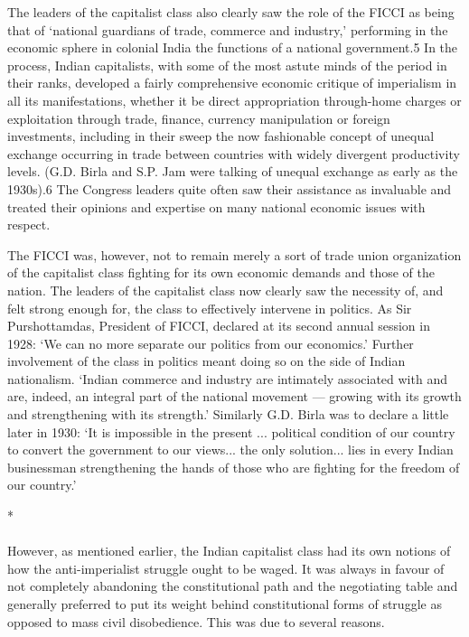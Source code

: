 The leaders of the capitalist class also clearly saw the role of the FICCI as being that of `national guardians of trade, commerce and industry,' performing in the economic sphere in colonial India the functions of a national government.5 In the process, Indian capitalists, with some of the most astute minds of the period in their ranks, developed a fairly comprehensive economic critique of imperialism in all its manifestations, whether it be direct appropriation through-home charges or exploitation through trade, finance, currency manipulation or foreign investments, including in their sweep the now fashionable concept of unequal exchange occurring in trade between countries with widely divergent productivity levels. (G.D. Birla and S.P. Jam were talking of unequal exchange as early as the 1930s).6 The Congress leaders quite often saw their assistance as invaluable and treated their opinions and expertise on many national economic issues with respect. 

The FICCI was, however, not to remain merely a sort of trade union organization of the capitalist class fighting for its own economic demands and those of the nation. The leaders of the capitalist class now clearly saw the necessity of, and felt strong enough for, the class to effectively intervene in politics. As Sir Purshottamdas, President of FICCI, declared at its second annual session in 1928: `We can no more separate our politics from our economics.' Further involvement of the class in politics meant doing so on the side of Indian nationalism. `Indian commerce and industry are intimately associated with and are, indeed, an integral part of the national movement — growing with its growth and strengthening with its strength.' Similarly G.D. Birla was to declare a little later in 1930: `It is impossible in the present ... political condition of our country to convert the government to our views... the only solution... lies in every Indian businessman strengthening the hands of those who are fighting for the freedom of our country.'

\begin{center}*\end{center}

\paragraph*{}


However, as mentioned earlier, the Indian capitalist class had its own notions of how the anti-imperialist struggle ought to be waged. It was always in favour of not completely abandoning the constitutional path and the negotiating table and generally preferred to put its weight behind constitutional forms of struggle as opposed to mass civil disobedience. This was due to several reasons. 

